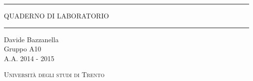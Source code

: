 \begin{titlepage}
\begin{center}

	\hrule \vspace{0.5cm}
     	\textsc{\LARGE QUADERNO DI LABORATORIO}
	\vspace{0.5cm} \hrule \vspace{2cm}

      	{\large Davide Bazzanella\\
		Gruppo A10}\\
	\vspace{0.5cm}
      	{\large A.A. 2014 - 2015}
	\vfill

	\vspace{1cm}
        \textsc{\Large Università degli studi di Trento}
	\vfill


\end{center}
\end{titlepage}
